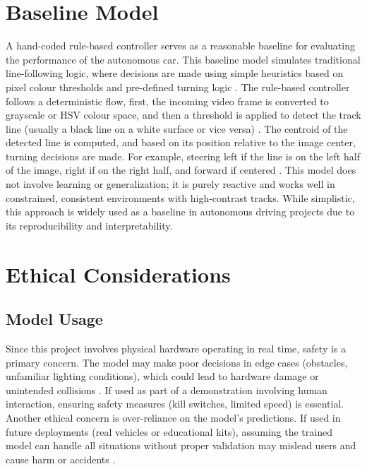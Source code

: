 \documentclass{article} %
\begin{document}
\section{Baseline Model}

A hand-coded rule-based controller serves as a reasonable baseline for evaluating the performance of the autonomous car. 
This baseline model simulates traditional line-following logic, where decisions are made using simple heuristics based on 
pixel colour thresholds and pre-defined turning logic \citep{LIKMETA2020103568}. The rule-based controller follows a deterministic flow, first, the incoming 
video frame is converted to grayscale or HSV colour space, and then a threshold is applied to detect the track line (usually a black line 
on a white surface or vice versa) \citep{LIKMETA2020103568}. The centroid of the detected line is computed, and based on its position relative to the image center, 
turning decisions are made. For example, steering left if the line is on the left half of the image, right if on the right half, and forward if 
centered \citep{bojarski2016endendlearningselfdriving}. This model does not involve learning or generalization; it is purely reactive and works well in constrained, consistent environments 
with high-contrast tracks. While simplistic, this approach is widely used as a baseline in autonomous driving projects due to its reproducibility 
and interpretability.

\section{Ethical Considerations}

\subsection{Model Usage}
Since this project involves physical hardware operating in real time, safety is a primary concern. The model may make poor decisions in edge cases 
(obstacles, unfamiliar lighting conditions), which could lead to hardware damage or unintended collisions \citep{dalrymple2024guaranteedsafeaiframework}. If used as part of a demonstration 
involving human interaction, ensuring safety measures (kill switches, limited speed) is essential. Another ethical concern is over-reliance on the 
model's predictions. If used in future deployments (real vehicles or educational kits), assuming the trained model can handle all situations without 
proper validation may mislead users and cause harm or accidents \citep{laskey2017comparinghumancentricrobotcentricsampling}. 
\end{document}
